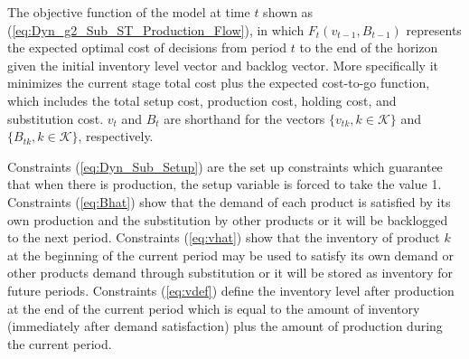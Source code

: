 \documentclass[10pt]{article}
\newcommand{\ti}{t} %
\newcommand{\ka}{k} %
\newcommand{\KA}{\mathcal{K}}
\newcommand{\Bi}{B} %
\newcommand{\Vi}{v} %
\newcommand{\Es}{S} %
\newcommand{\InvPos}{inventory level after production }
\newcommand{\cn}{\mathcal{C}(n) }
\begin{document}



The objective function of the model at time $\ti$ shown as (\ref{eq:Dyn_g2_Sub_ST_Production_Flow}), in which $F_{\ti}({\Vi}_{\ti-1},{\Bi}_{\ti-1}) $ represents the expected optimal cost of decisions from period $\ti$ to the end of the horizon given the initial inventory level vector and backlog vector. More specifically it minimizes the current stage total cost plus the expected cost-to-go function, which includes the total setup cost, production cost, holding cost, and substitution cost.  $\Vi_\ti$ and $\Bi_\ti$ are shorthand for the vectors $\{ v_{\ti \ka}, \ka \in \KA\}$ and $\{ B_{\ti \ka}, \ka \in \KA\}$, respectively.

Constraints (\ref{eq:Dyn_Sub_Setup}) are the set up constraints which guarantee that when there is production, the setup variable is forced to take the value 1. 
Constraints (\ref{eq:Bhat}) show that the demand of each product is satisfied by its own production and the substitution by other products or it will be backlogged to the next period.
Constraints (\ref{eq:vhat}) show that the inventory of product $\ka$ at the beginning of the current period may be used to satisfy its own demand or other products demand through substitution or it will be stored as inventory for future periods. 
Constraints (\ref{eq:vdef}) define the \InvPos at the end of the current period which is equal to the amount of inventory (immediately after demand satisfaction) plus the amount of production during the current period.
\end{document}
